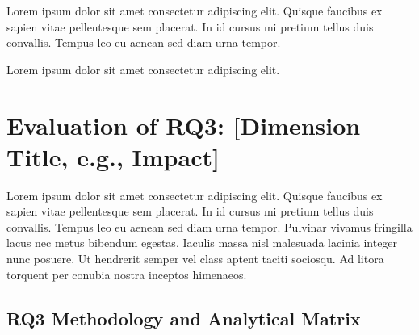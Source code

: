 \documentclass[sigconf,nonacm]{acmart} %
\begin{document}
Lorem ipsum dolor sit amet consectetur adipiscing elit.
Quisque faucibus ex sapien vitae pellentesque sem placerat. 
In id cursus mi pretium tellus duis convallis. 
Tempus leo eu aenean sed diam urna tempor. 



Lorem ipsum dolor sit amet consectetur adipiscing elit.

\section{Evaluation of RQ3: [Dimension Title, e.g., Impact]}
\label{sec:rq3_evaluation}

Lorem ipsum dolor sit amet consectetur adipiscing elit.
Quisque faucibus ex sapien vitae pellentesque sem placerat. 
In id cursus mi pretium tellus duis convallis.
Tempus leo eu aenean sed diam urna tempor. 
Pulvinar vivamus fringilla lacus nec metus bibendum egestas.
Iaculis massa nisl malesuada lacinia integer nunc posuere. 
Ut hendrerit semper vel class aptent taciti sociosqu. 
Ad litora torquent per conubia nostra inceptos himenaeos.

\subsection{RQ3 Methodology and Analytical Matrix}
\label{subsec:rq3_methodology}

\end{document}
